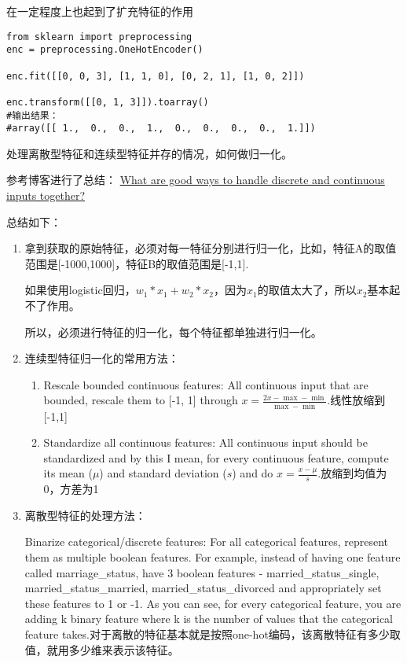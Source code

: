 \documentclass[10pt,a4paper]{ctexbook}
\begin{document}
在一定程度上也起到了扩充特征的作用

\begin{verbatim}
from sklearn import preprocessing
enc = preprocessing.OneHotEncoder()

enc.fit([[0, 0, 3], [1, 1, 0], [0, 2, 1], [1, 0, 2]])

enc.transform([[0, 1, 3]]).toarray()
#输出结果：
#array([[ 1.,  0.,  0.,  1.,  0.,  0.,  0.,  0.,  1.]])
\end{verbatim}

处理离散型特征和连续型特征并存的情况，如何做归一化。

参考博客进行了总结：
\href{https://www.quora.com/What-are-good-ways-to-handle-discrete-and-continuous-inputs-together}{What are good ways to handle discrete and continuous inputs together?}

总结如下：
\begin{enumerate}
\item 拿到获取的原始特征，必须对每一特征分别进行归一化，比如，特征A的取值范围是[-1000,1000]，特征B的取值范围是[-1,1].

如果使用logistic回归，$w_{1}*x_{1}+w_{2}*x_{2}$，因为$x_{1}$的取值太大了，所以$x_{2}$基本起不了作用。

所以，必须进行特征的归一化，每个特征都单独进行归一化。

\item 连续型特征归一化的常用方法：
    \begin{enumerate}
    \item Rescale bounded continuous features: All continuous input that are bounded, rescale them to [-1, 1] through $x = \frac{2x - \max - \min}{\max - \min}$.线性放缩到[-1,1]
    \item Standardize all continuous features: All continuous input should be standardized and by this I mean, for every continuous feature, compute its mean ($\mu$) and standard deviation ($s$) and do $x=\frac{x - \mu}{s}$.放缩到均值为0，方差为1
    \end{enumerate}

\item 离散型特征的处理方法：

Binarize categorical/discrete features: For all categorical features, represent them as multiple boolean features. For example, instead of having one feature called marriage\_status, have 3 boolean features - married\_status\_single, married\_status\_married, married\_status\_divorced and appropriately set these features to 1 or -1. As you can see, for every categorical feature, you are adding k binary feature where k is the number of values that the categorical feature takes.对于离散的特征基本就是按照one-hot编码，该离散特征有多少取值，就用多少维来表示该特征。
\end{enumerate}
\end{document}
